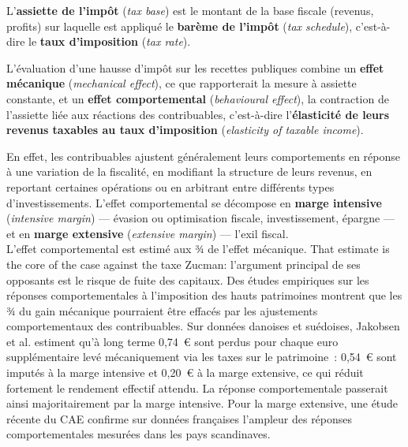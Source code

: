 \begin{definition}
  L'\textbf{assiette de l'impôt} (\textit{tax base}) est le montant de la base
  fiscale (revenus, profits) sur laquelle est appliqué le \textbf{barème de
  l'impôt} (\textit{tax schedule}), c'est-à-dire le \textbf{taux d'imposition}
  (\textit{tax rate}).
\end{definition}

\begin{definition}
  L'évaluation d'une hausse d'impôt sur les recettes publiques combine un
  \textbf{effet mécanique} (\textit{mechanical effect}), ce que rapporterait la
  mesure à assiette constante, et un \textbf{effet comportemental}
  (\textit{behavioural effect}), la contraction de l'assiette liée aux réactions
  des contribuables, c'est-à-dire l'\textbf{élasticité de leurs revenus
  taxables au taux d'imposition} (\textit{elasticity of taxable income}).
\end{definition}

En effet, les contribuables ajustent généralement leurs comportements en réponse
à une variation de la fiscalité, en modifiant la structure de leurs revenus, en
reportant certaines opérations ou en arbitrant entre différents types
d'investissements. L'effet comportemental se décompose en \textbf{marge
intensive} (\textit{intensive margin}) --- évasion ou optimisation fiscale,
investissement, épargne --- et en \textbf{marge extensive} (\textit{extensive
margin}) --- l'exil fiscal.\\

L'effet comportemental est estimé aux ¾ de l'effet mécanique. That estimate is
the core of the case against the taxe Zucman: l'argument principal de ses
opposants est le risque de fuite des capitaux. Des études empiriques sur les
réponses comportementales à l'imposition des hauts patrimoines montrent que les
¾ du gain mécanique pourraient être effacés par les ajustements
comportementaux des contribuables. Sur données danoises et suédoises, Jakobsen
et al. estiment qu'à long terme 0,74~€ sont perdus pour chaque euro
supplémentaire levé mécaniquement via les taxes sur le patrimoine~: 0,54~€ sont
imputés à la marge intensive et 0,20~€ à la marge extensive, ce qui réduit
fortement le rendement effectif attendu. La réponse comportementale passerait
ainsi majoritairement par la marge intensive. Pour la marge extensive, une étude
récente du CAE confirme sur données françaises l'ampleur des réponses
comportementales mesurées dans les pays scandinaves.

